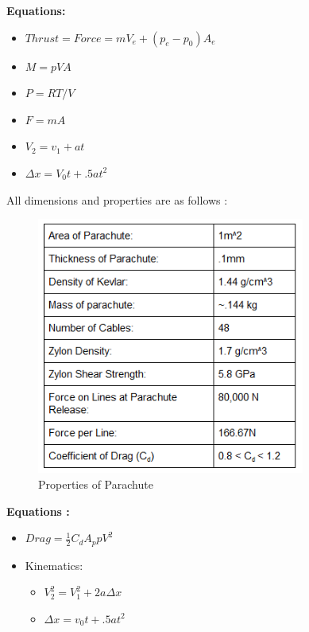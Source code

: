 \documentclass[%
 portrait,
 aapm,
 mph,%
 amsmath,amssymb,
 reprint,%
]{revtex4-2}
\begin{document}
\textbf{Equations:}
\begin{itemize}
    \item \begin{math} Thrust = Force = mV_e + (p_e - p_0)A_e \end{math}
    \item \begin{math} M = pVA \end{math}
    \item \begin{math} P = RT/V \end{math}
    \item \begin{math} F = mA \end{math}
    \item \begin{math} V_2 = v_1 + at \end{math}
    \item \begin{math} \Delta x = V_0t + .5at^2\end{math}
\end{itemize}
All dimensions and properties are as follows \cite{UniversityofIdaho, wiki:004, wiki:005, alqassim2011mechanical, NASAMarsExplorationRovers:001}:
\begin{figure}[h!]
  \includegraphics[width=250pt]{DescentandLanding/yParaSpecs.png}
   \caption{Properties of Parachute}
\end{figure} 

\textbf{Equations \cite{wiki:002}:}
\begin{itemize}
    \item \begin{math} Drag = \frac{1}{2}C_dA_ppV^2 \end{math}
    \item Kinematics:
    \begin{itemize}
        \item \begin{math} V_2^2 = V_1^2 + 2a\Delta x \end{math}
        \item \begin{math} \Delta x = v_0t + .5at^2 \end{math}
    \end{itemize}
\end{itemize}
\end{document}
